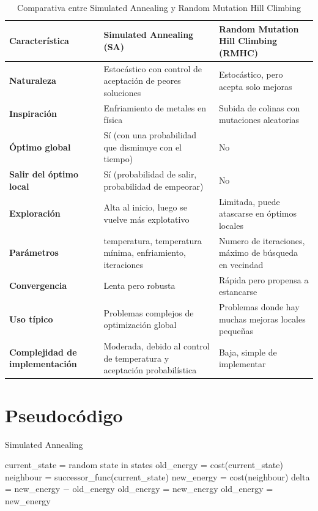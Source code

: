\documentclass[12pt,twoside]{article}
\begin{document}
\begin{table}[h!]
	\centering
	\begin{tabular}{|p{}|p{}|p{}|}
		\hline
		\textbf{Característica} & \textbf{Simulated Annealing (SA)} & \textbf{Random Mutation Hill Climbing (RMHC)} \\
		\hline
		\textbf{Naturaleza} & Estocástico con control de aceptación de peores soluciones & Estocástico, pero acepta solo mejoras \\
		\hline
		\textbf{Inspiración} & Enfriamiento de metales en física & Subida de colinas con mutaciones aleatorias \\
		\hline
		\textbf{Óptimo global} & Sí (con una probabilidad que disminuye con el tiempo) & No \\
		\hline
		\textbf{Salir del óptimo local} & Sí (probabilidad de salir, probabilidad de empeorar) & No \\
		\hline
		\textbf{Exploración} & Alta al inicio, luego se vuelve más explotativo & Limitada, puede atascarse en óptimos locales \\
		\hline
		\textbf{Parámetros} & temperatura, temperatura mínima, enfriamiento, iteraciones   & Numero de iteraciones, máximo de búsqueda en vecindad \\
		\hline
		\textbf{Convergencia} & Lenta pero robusta & Rápida pero propensa a estancarse \\
		\hline
		\textbf{Uso típico} & Problemas complejos de optimización global & Problemas donde hay muchas mejoras locales pequeñas \\
		\hline
		\textbf{Complejidad de implementación} & Moderada, debido al control de temperatura y aceptación probabilística & Baja, simple de implementar \\
		\hline
	\end{tabular}
	\caption{Comparativa entre Simulated Annealing y Random Mutation Hill Climbing}
\end{table}

	
\clearpage
\section{Pseudocódigo}
		
	\begin{algorithm}[H]
		\caption{Simulated Annealing}
		\begin{algorithmic}[1]
			\State current\_state = random state in states 
			\State old\_energy = cost(current\_state) 
					\State neighbour = successor\_func(current\_state)
					\State new\_energy = cost(neighbour)
					\State delta = new\_energy $-$ old\_energy 
							\State old\_energy = new\_energy
						\EndIf
					\Else
						\State old\_energy = new\_energy
					\EndIf
				\EndFor 
			\EndFor
		\end{algorithmic}
		\label{alg:simulated_annealing}
	\end{algorithm}
		
\end{document}
